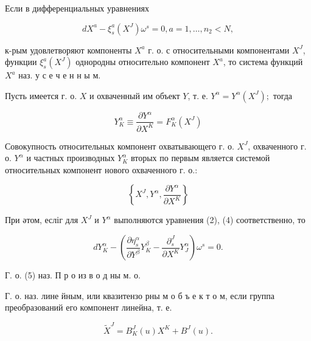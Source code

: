 \documentclass[10pt]{article}
\begin{document}
Если в дифференциальных уравнениях



\[

d X^{a}-\xi_{s}^{a}\left(X^{J}\right) \omega^{s}=0, a=1, \ldots, n_{2}<N,

\]



к-рым удовлетворяют компоненты $X^{a}$ г. о. с относительными компонентами $X^{J}$, функции $\xi_{s}^{a}\left(X^{J}\right)$ однородны относительно компонент $X^{a}$, то система функций $X^{a}$ наз. у с е ч е н н ы м.



Пусть имеется г. о. $X$ и охваченный им объект $Y$, т. е. $Y^{\alpha}=Y^{\alpha}\left(X^{J}\right) ;$ тогда



\[

Y_{K}^{\alpha} \equiv \frac{\partial Y^{\alpha}}{\partial X^{K}}=F_{K}^{\alpha}\left(X^{J}\right)

\]



Совокупность относительных компонент охватывающего г. о. $X^{J}$, охваченного г. о. $Y^{\alpha}$ и частных производных $Y_{K}^{\alpha}$ вторых по первым является системой относительных компонент нового охваченного г. о.:



\[

\left\{X^{J}, Y^{\alpha}, \frac{\partial Y^{\alpha}}{\partial X^{K}}\right\}

\]



При әтом, есліг для $X^{J}$ и $Y^{\alpha}$ выполняются уравнения (2), (4) соответственно, то



\[

d Y_{K}^{\alpha}-\left(\frac{\partial \eta_{s}^{\alpha}}{\partial Y^{\beta}} Y_{K}^{\beta}-\frac{\partial_{s}^{J}}{\partial X^{K}} Y_{J}^{\alpha}\right) \omega^{s}=0 .

\]



Г. о. (5) наз. П р о из в о д ны м. $о$.



Г. о. наз. лине йным, или квазитензо рны м о б ъ е к т о м, если группа преобразований его компонент линейна, т. е.



\[

\tilde{X}^{J}=B_{K}^{J}(u) X^{K}+B^{J}(u) .

\]
\end{document}
